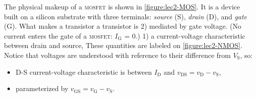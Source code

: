 The physical makeup of a \textsc{mosfet} is shown in \autoref{figure:lec2-MOS}.
It is a device built on a silicon substrate with three terminals:
\emph{source} (S), \emph{drain} (D), and \emph{gate} (G).
What makes a transistor a transistor is
2) mediated by gate voltage. (No current enters the gate of a \textsc{mosfet}: \(I_\text{G}\) = 0.)
1) a current-voltage characteristic between drain and source,
These quantities are labeled on \autoref{figure:lec2-NMOS}.
Notice that voltages are understood with reference to their difference from \(V_\text{S}\), so:
\begin{itemize}
  \item D-S current-voltage characteristic is between \(I_\text{D}\) and \(v_\text{DS} = v_\text{D} - v_\text{S}\),%
  \item parameterized by \(v_\text{GS} = v_\text{G} - v_\text{S}\).
\end{itemize}



